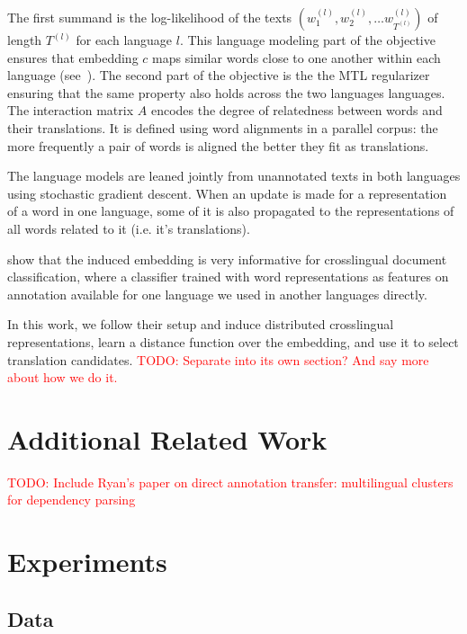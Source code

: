 \documentclass[11pt,letterpaper]{article}
\newcommand{\todo}[1]{\textcolor{red}{TODO: #1}}
\begin{document}
The first summand is the log-likelihood of the texts $(w_1^{(l)}, w_2^{(l)}, \dots w_{T^{(l)}}^{(l)})$ of length $T^{(l)}$ for each language $l$.  This language modeling part of the objective ensures that embedding $c$ maps similar words close to one another within each language (see~).  The second part of the objective is the the MTL regularizer ensuring that the same property also holds across the two languages languages.  
The interaction matrix $A$ encodes the degree of relatedness between words and their translations.   
It is defined using word alignments in a parallel corpus: the more frequently a pair of words is aligned the better they fit as translations.

The language models are leaned jointly from unannotated texts in both languages using stochastic gradient descent.  When an update is made for a representation of a word in one language, some of it is also propagated to the representations of all words related to it (i.e. it's translations).

 show that the induced embedding is very informative for crosslingual document classification, where a classifier trained with word representations as features on annotation available for one language we used in another languages directly.  

In this work, we follow their setup and induce distributed crosslingual representations, learn a distance function over the embedding, and use it to select translation candidates. \todo{Separate into its own section?  And say more about how we do it.}

\section{Additional Related Work} \label{sect:rework}

\todo{Include Ryan's paper on direct annotation transfer: multilingual clusters for dependency parsing}

\section{Experiments} \label{sect:experiments}

\subsection{Data}
\end{document}
